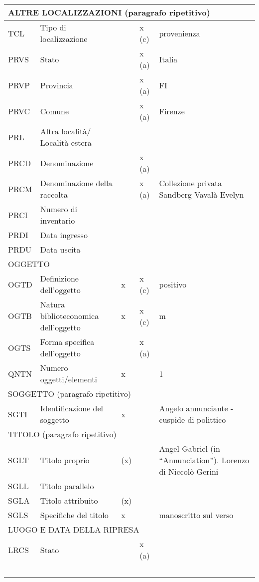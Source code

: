 \begin{center}
\begin{longtable}{ | p{1cm} | p{4cm} | p{.6cm} | p{.6cm} | p{5cm} | }
  \multicolumn{5}{|l|}{\cellcolor{lightcyan}ALTRE LOCALIZZAZIONI (paragrafo ripetitivo)}\\ \hline
  TCL & Tipo di localizzazione &  & x (c) & provenienza \\ \hline
  PRVS & Stato &  & x (a) & Italia \\ \hline
  PRVP & Provincia &  & x (a) & FI \\ \hline
  PRVC & Comune &  & x (a) & Firenze \\ \hline
  PRL & Altra località/ Località estera &  &  &  \\ \hline
  PRCD & Denominazione &  & x (a) &  \\ \hline
  PRCM & Denominazione della raccolta &  & x (a) & Collezione privata Sandberg Vavalà Evelyn \\ \hline
  PRCI & Numero di inventario &  &  &  \\ \hline
  PRDI & Data ingresso &  &  &  \\ \hline
  PRDU & Data uscita &  &  &  \\ \hline
  \multicolumn{5}{|l|}{\cellcolor{lightcyan}OGGETTO} \\ \hline
  OGTD & Definizione dell’oggetto & x & x (c) & positivo \\ \hline
  OGTB & Natura biblioteconomica dell’oggetto & x & x (c) & m \\ \hline
  OGTS & Forma specifica dell’oggetto &  & x (a) &  \\ \hline
  QNTN & Numero oggetti/elementi & x &  & 1 \\ \hline
  \multicolumn{5}{|l|}{\cellcolor{lightcyan}SOGGETTO (paragrafo ripetitivo)}\\ \hline
  SGTI & Identificazione del soggetto & x &  & Angelo annunciante - cuspide di polittico \\ \hline
  \multicolumn{5}{|l|}{\cellcolor{lightcyan}TITOLO (paragrafo ripetitivo)}\\ \hline
  SGLT & Titolo proprio & (x) &  & Angel Gabriel (in ``Annunciation''). Lorenzo di Niccolò Gerini \\ \hline
  SGLL & Titolo parallelo &  &  &  \\ \hline
  SGLA & Titolo attribuito & (x) &  &  \\ \hline
  SGLS & Specifiche del titolo & x &  & manoscritto sul verso \\ \hline
  \multicolumn{5}{|l|}{\cellcolor{lightcyan}LUOGO E DATA DELLA RIPRESA}\\ \hline
  LRCS & Stato &  & x (a) &  \\ \hline\

\end{longtable}
\end{center}
